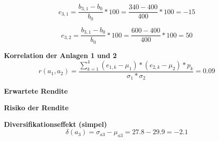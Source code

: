 \documentclass[11pt,twocolumn,fleqn]{article}
\begin{document}
\begin{equation*}
e_{3,1} = \frac{b_{3,1}-b_0} {b_0}* 100 = \frac{340-400}{400}*100=-15
\end{equation*}

\begin{equation*}
e_{3,2} = \frac{b_{3,1}-b_0} {b_0}* 100 = \frac{600-400}{400}*100=50
\end{equation*}

\textbf{Korrelation der Anlagen 1 und 2}
\begin{equation*}
r(a_1,a_2)=\frac{ \sum^4_{k=1}(e_{1,k}-\mu_1)*(e_{2,k}-\mu_2)*p_k }{ \sigma_1 * \sigma_2 } = 0.09
\end{equation*}


\textbf{Erwartete Rendite}
\begin{equation*}
\end{equation*}

\textbf{Risiko der Rendite}

\textbf{Diversifikationseffekt (simpel)}
\begin{equation*}
\delta(a_3)=\sigma_{a3}-\mu_{a3} = 27.8 - 29.9 = -2.1
\end{equation*}
\end{document}
